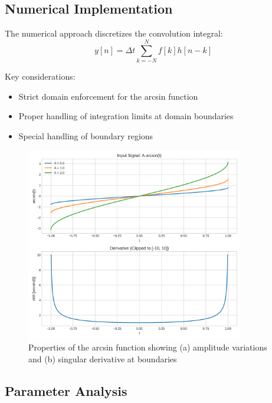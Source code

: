 \subsection{Numerical Implementation}
The numerical approach discretizes the convolution integral:
\begin{equation}
y[n] = \Delta t \sum_{k=-N}^{N} f[k]h[n-k]
\end{equation}

Key considerations:
\begin{itemize}
\item Strict domain enforcement for the arcsin function
\item Proper handling of integration limits at domain boundaries
\item Special handling of boundary regions
\end{itemize}

\begin{figure}[H]
    \centering
    \includegraphics[width=0.85\textwidth]{codes/codes_sin_1_and_arcsin/figures/arcsin_properties.png}
    \caption{Properties of the arcsin function showing (a) amplitude variations and (b) singular derivative at boundaries}
    \label{fig:properties}
\end{figure}

\subsection{Parameter Analysis}

